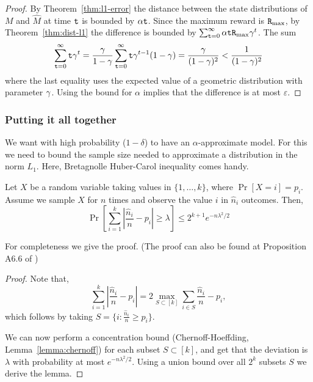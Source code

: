 \begin{proof}
By Theorem~\ref{thm:l1-error} the distance between the state distributions of $M$ and $\widehat{M}$ at time ${\tt t}$ is bounded by $\alpha{\tt t}$. Since the maximum reward  is ${\tt R}_{\max }$, by Theorem~\ref{thm:dist-l1} the difference is bounded by
$\sum_{{\tt t}=0}^\infty \alpha{\tt t} {\tt R}_{\max }\gamma^t$.
The sum 
$$\sum_{{\tt t}=0}^\infty {\tt t} \gamma^t=\frac{\gamma}{1-\gamma}\sum_{{\tt t}=0}^\infty {\tt t} \gamma^{t-1}(1-\gamma)=\frac{\gamma}{(1-\gamma)^2}< \frac{1}{(1-\gamma)^2}$$
where the last equality uses the expected value of a geometric distribution with parameter $\gamma$.
%
Using the bound for $\alpha$ implies that the difference is at most $\varepsilon$.
%
\end{proof}

\subsubsection{Putting it all together}

We want with high probability ($1-\delta$) to have an
$\alpha$-approximate model. For this we need to bound the sample
size needed to approximate a distribution in the norm $L_1$. Here,
Bretagnolle Huber-Carol inequality comes handy.

\begin{lemma}
Let $X$ be a random variable taking values in $\{1, \ldots , k\}$,
where $\Pr[X=i]=p_i$. Assume we sample $X$ for $n$ times and
observe the value $i$ in $\hat{n}_i$ outcomes. Then,
\[
\Pr[\sum_{i=1}^k \left|\frac{\hat{n}_i}{n}-p_i\right|\geq
\lambda]\leq 2^{k+1} e^{-n\lambda^2/2}
\]
\end{lemma}

For completeness we give the proof. (The proof can also be found at
Proposition A6.6 of %
\cite{van1996weak})
\begin{proof}
Note that,
\[
\sum_{i=1}^k |\frac{\hat{n}_i}{n}-p_i| = 2\max_{S\subset [k]}
\sum_{i\in S} \frac{\hat{n}_i}{n}-p_i,
\]
which follows by taking $S=\{i:\frac{\hat{n}_i}{n}\geq p_i\}$.

We can now perform a concentration bound (Chernoff-Hoeffding, Lemma~\ref{lemma:chernoff}) for
each subset $S\subset [k]$, and get that the deviation is $\lambda$
with probability at most $e^{-n\lambda^2/2}$. Using a union bound
over all $2^k$ subsets $S$ we
 derive the lemma.
\end{proof}

